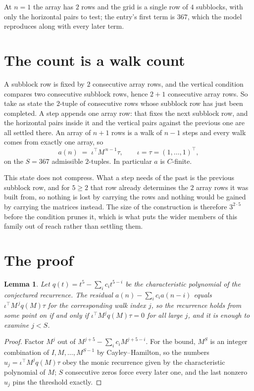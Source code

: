 \documentclass[11pt,a4paper]{article}
\theoremstyle{plain}
\newtheorem{lemma}[theorem]{Lemma}
\theoremstyle{definition}
\begin{document}
At $n=1$ the array has $2$ rows and the grid is a single row of $4$
subblocks, with only the horizontal pairs to test; the entry's first term is
$367$, which the model reproduces along with every later term.

\section{The count is a walk count}

A subblock row is fixed by $2$ consecutive array rows, and the vertical condition compares
two consecutive subblock rows, hence $2+1$ consecutive array rows. So take as state the
$2$-tuple of consecutive rows whose subblock row has just been completed. A step appends one
array row: that fixes the next subblock row, and the horizontal pairs inside it and the
vertical pairs against the previous one are all settled there. An array of $n+1$ rows is
a walk of $n-1$ steps and every walk comes from exactly one array, so
\[
a(n)\;=\;\iota^{\!\top}M^{\,n-1}\tau,\qquad\iota=\tau=(1,\dots,1)^{\!\top},
\]
on the $S=367$ admissible $2$-tuples. In particular $a$ is $C$-finite.

This state does not compress. What a step needs of the past is the previous subblock row, and
for $5\ge2$ that row already determines the $2$ array rows it was built from, so nothing
is lost by carrying the rows and nothing would be gained by carrying the matrices instead. The
size of the construction is therefore $3^{2\cdot5}$ before the condition prunes
it, which is what puts the wider members of this family out of reach rather than settling them.

\section{The proof}

\begin{lemma}\label{lem:crit}
Let $q(t)=t^{5}-\sum_i c_it^{5-i}$ be the characteristic polynomial of the
conjectured recurrence. The residual $a(n)-\sum_ic_ia(n-i)$ equals
$\iota^{\!\top}M^{\,j}q(M)\tau$ for the corresponding walk index $j$, so the recurrence
holds from some point on if and only if $\iota^{\!\top}M^{j}q(M)\tau=0$ for all large $j$,
and it is enough to examine $j<S$.
\end{lemma}

\begin{proof}
Factor $M^{j}$ out of $M^{j+5}-\sum_ic_iM^{j+5-i}$. For the bound, $M^{S}$
is an integer combination of $I,M,\dots,M^{S-1}$ by Cayley--Hamilton, so the numbers
$u_j=\iota^{\!\top}M^{j}q(M)\tau$ obey the monic recurrence given by the characteristic
polynomial of $M$; $S$ consecutive zeros force every later one, and the last nonzero $u_j$
pins the threshold exactly.
\end{proof}
\end{document}
